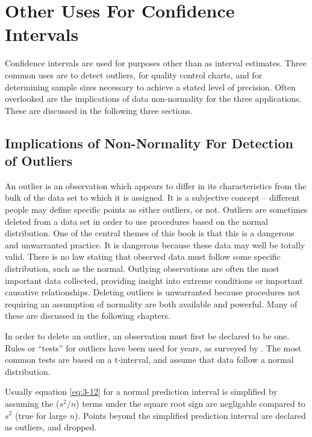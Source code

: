 \documentclass[]{book}
\begin{document}
\hypertarget{other-uses-for-confidence-intervals}{%
\section{Other Uses For Confidence Intervals}\label{other-uses-for-confidence-intervals}}

Confidence intervals are used for purposes other than as interval estimates. Three common uses are to detect outliers, for quality control charts, and for determining sample sizes necessary to achieve a stated level of precision. Often overlooked are the implications of data non-normality for the three applications. These are discussed in the following three sections.

\hypertarget{implications-of-non-normality-for-detection-of-outliers}{%
\subsection{Implications of Non-Normality For Detection of Outliers}\label{implications-of-non-normality-for-detection-of-outliers}}

An outlier is an observation which appears to differ in its characteristics from the bulk of the data set to which it is assigned. It is a subjective concept -- different people may define specific points as either outliers, or not. Outliers are sometimes deleted from a data set in order to use procedures based on the normal distribution. One of the central themes of this book is that this is a dangerous and unwarranted practice. It is dangerous because these data may well be totally valid. There is no law stating that observed data must follow some specific distribution, such as the normal. Outlying observations are often the most important data collected, providing insight into extreme conditions or important causative relationships. Deleting outliers is unwarranted because procedures not requiring an assumption of normality are both available and powerful. Many of these are discussed in the following chapters.

In order to delete an outlier, an observation must first be declared to be one. Rules or ``tests'' for outliers have been used for years, as surveyed by \citet{beckman_outlier_1983}. The most common tests are based on a t-interval, and assume that data follow a normal distribution.

Usually equation \eqref{eq:3-12} for a normal prediction interval is simplified by assuming the (\(s^{2} / n\)) terms under the square root sign are negligable compared to \(s^{2}\) (true for large \(n\)). Points beyond the simplified prediction interval are declared as outliers, and dropped.
\end{document}
